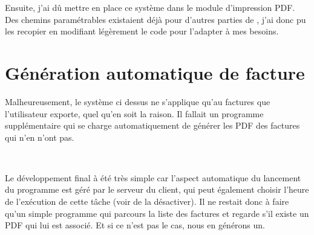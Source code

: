 Ensuite, j'ai dû mettre en place ce système dans le module d'impression PDF. Des chemins paramétrables existaient déjà pour d'autres parties de \integrale, j'ai donc pu les recopier en modifiant légèrement le code pour l'adapter à mes besoins.

\section{Génération automatique de facture}
Malheureusement, le système ci dessus ne s'applique qu'au factures que l'utilisateur exporte, quel qu'en soit la raison. Il fallait un programme supplémentaire qui se charge automatiquement de générer les PDF des factures qui n'en n'ont pas.

~

Le développement final à été très simple car l'aspect automatique du lancement du programme est géré par le serveur du client, qui peut également choisir l'heure de l'exécution de cette tâche (voir de la désactiver). Il ne restait donc à faire qu'un simple programme qui parcours la liste des factures et regarde s'il existe un PDF qui lui est associé. Et si ce n'est pas le cas, nous en générons un.
